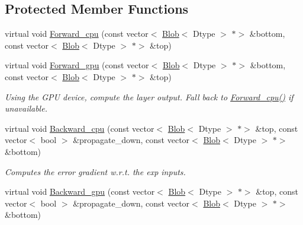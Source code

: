 \subsection*{Protected Member Functions}
\begin{DoxyCompactItemize}
\item 
virtual void \mbox{\hyperlink{classcaffe_1_1_log_layer_a407de9bdb364ed170a73c6eebc74dce9}{Forward\+\_\+cpu}} (const vector$<$ \mbox{\hyperlink{classcaffe_1_1_blob}{Blob}}$<$ Dtype $>$ $\ast$$>$ \&bottom, const vector$<$ \mbox{\hyperlink{classcaffe_1_1_blob}{Blob}}$<$ Dtype $>$ $\ast$$>$ \&top)
\item 
\mbox{\label{classcaffe_1_1_log_layer_a37ec5bf1dc1a00c1830ec92fcf22fe09}} 
virtual void \mbox{\hyperlink{classcaffe_1_1_log_layer_a37ec5bf1dc1a00c1830ec92fcf22fe09}{Forward\+\_\+gpu}} (const vector$<$ \mbox{\hyperlink{classcaffe_1_1_blob}{Blob}}$<$ Dtype $>$ $\ast$$>$ \&bottom, const vector$<$ \mbox{\hyperlink{classcaffe_1_1_blob}{Blob}}$<$ Dtype $>$ $\ast$$>$ \&top)
\begin{DoxyCompactList}\small\item\em Using the G\+PU device, compute the layer output. Fall back to \mbox{\hyperlink{classcaffe_1_1_log_layer_a407de9bdb364ed170a73c6eebc74dce9}{Forward\+\_\+cpu()}} if unavailable. \end{DoxyCompactList}\item 
virtual void \mbox{\hyperlink{classcaffe_1_1_log_layer_a79f6398d807b7d751820528d5a68faa7}{Backward\+\_\+cpu}} (const vector$<$ \mbox{\hyperlink{classcaffe_1_1_blob}{Blob}}$<$ Dtype $>$ $\ast$$>$ \&top, const vector$<$ bool $>$ \&propagate\+\_\+down, const vector$<$ \mbox{\hyperlink{classcaffe_1_1_blob}{Blob}}$<$ Dtype $>$ $\ast$$>$ \&bottom)
\begin{DoxyCompactList}\small\item\em Computes the error gradient w.\+r.\+t. the exp inputs. \end{DoxyCompactList}\item 
\mbox{\label{classcaffe_1_1_log_layer_ac31070a5303ee3e4c04b01326cb0c40a}} 
virtual void \mbox{\hyperlink{classcaffe_1_1_log_layer_ac31070a5303ee3e4c04b01326cb0c40a}{Backward\+\_\+gpu}} (const vector$<$ \mbox{\hyperlink{classcaffe_1_1_blob}{Blob}}$<$ Dtype $>$ $\ast$$>$ \&top, const vector$<$ bool $>$ \&propagate\+\_\+down, const vector$<$ \mbox{\hyperlink{classcaffe_1_1_blob}{Blob}}$<$ Dtype $>$ $\ast$$>$ \&bottom)

\end{DoxyCompactItemize}

